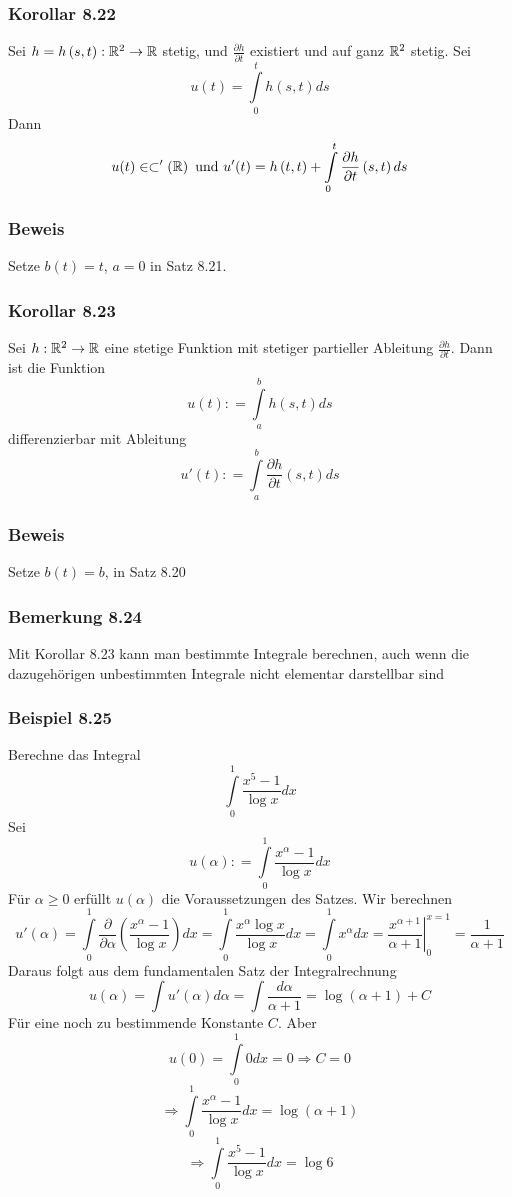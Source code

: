 \subsubsection*{Korollar 8.22}
Sei $h=h\left( s,t\right) :\mathbb{R}^2\to\mathbb{R}$ stetig, und $\frac{\partial h}{\partial t}$ existiert und auf ganz $\mathbb{R}^2$ stetig. Sei \[u(t) = \int\limits_0^t {h\left( {s,t} \right)ds} \] Dann \[u(t) \in  \subset '\left( \mathbb{R}\right)\text{ und }u'(t) = h\left( {t,t} \right) + \int\limits_0^t {\frac{{\partial h}}{{\partial t}}\left( {s,t} \right)ds} \]

\subsubsection*{Beweis}
Setze $b(t)=t$, $a=0$ in Satz 8.21.

\subsubsection*{Korollar 8.23}
Sei $h:\mathbb{R}^2\to\mathbb{R}$ eine stetige Funktion mit stetiger partieller Ableitung $\frac{\partial h}{\partial t}$. Dann ist die Funktion \[u(t): = \int\limits_a^b {h(s,t)ds} \] differenzierbar mit Ableitung \[u'(t): = \int\limits_a^b {\frac{{\partial h}}{{\partial t}}(s,t)ds} \]

\subsubsection*{Beweis}
Setze $b(t)=b$, in Satz 8.20

\subsubsection*{Bemerkung 8.24}
Mit Korollar 8.23 kann man bestimmte Integrale berechnen, auch wenn die dazugehörigen unbestimmten Integrale nicht elementar darstellbar sind
\subsubsection*{Beispiel 8.25}
Berechne das Integral \[\int\limits_0^1 {\frac{{{x^5} - 1}}{{\log x}}} dx\] Sei \[u\left( \alpha  \right): = \int\limits_0^1 {\frac{{{x^\alpha } - 1}}{{\log x}}dx} \] Für $\alpha \geq 0$ erfüllt $u\left(\alpha\right)$ die Voraussetzungen des Satzes. Wir berechnen \[u'\left( \alpha  \right) = \int\limits_0^1 {\frac{\partial }{{\partial \alpha }}\left( {\frac{{{x^\alpha } - 1}}{{\log x}}} \right)dx}  = \int\limits_0^1 {\frac{{{x^\alpha }\log x}}{{\log x}}dx = \int\limits_0^1 {{x^\alpha }dx}  = \left. {\frac{{{x^{\alpha  + 1}}}}{{\alpha  + 1}}} \right|_0^{x = 1} = } \frac{1}{{\alpha  + 1}}\]
Daraus folgt aus dem fundamentalen Satz der Integralrechnung \[u\left( \alpha  \right) = \int {u'\left( \alpha  \right)d\alpha  = \int {\frac{{d\alpha }}{{\alpha  + 1}} = \log \left( {\alpha  + 1} \right)} }  + C\]
Für eine noch zu bestimmende Konstante $C$. Aber
\[u\left( 0 \right) = \int\limits_0^1 {0dx = 0 \Rightarrow C = 0} \]
\[ \Rightarrow \int\limits_0^1 {\frac{{{x^\alpha } - 1}}{{\log x}}dx = \log \left( {\alpha  + 1} \right)} \]
\[ \Rightarrow \int\limits_0^1 {\frac{{{x^5} - 1}}{{\log x}}dx = \log 6} \]

